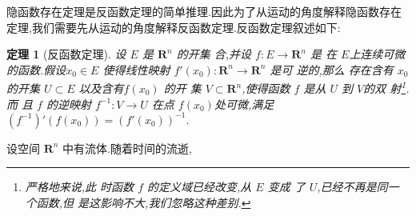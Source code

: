 \documentclass[a4paper, 12pt]{article} %
\newtheorem*{adtheorem}{定理}
\newenvironment{theorem}
{\bigskip\begin{mdframed}[backgroundcolor=gray!40,rightline=false,leftline=false,topline=false,bottomline=false]\begin{adtheorem}}
    {\end{adtheorem}\end{mdframed}\bigskip}
\begin{document}
隐函数存在定理是反函数定理的简单推理.因此为了从运动的角度解释隐函数存在
定理,我们需要先从运动的角度解释反函数定理.反函数定理叙述如下:
\begin{theorem}[反函数定理]
  设 $ E$ 是 $ \mathbf{R}^n$ 的开集 合,并设 $
  f:E\rightarrow\mathbf{R}^n$ 是 在 $ E$上连续可微的函数.假设$ x_0\in
  E$ 使得线性映射 $ f'(x_0):\mathbf{R}^n\rightarrow \mathbf{R}^n$ 是可
  逆的,那么 存在含有 $ x_0$ 的开集 $ U\subset E$ 以及含有$ f(x_0)$ 的开
  集 $ V\subset \mathbf{R}^n$,使得函数 $ f$ 是从 $ U$ 到 $ V$的双
  射\footnote{严格地来说,此 时函数 $ f$ 的定义域已经改变,从 $ E$ 变成
    了 $ U$,已经不再是同一个函数,但 是这影响不大,我们忽略这种差别.}.而
  且 $ f$ 的逆映射 $ f^{-1}:V\rightarrow U$ 在点 $ f(x_0)$处可微,满足$
  {\displaystyle (f^{-1})'(f(x_0))=(f'(x_0))^{-1}.}$
\end{theorem}
设空间 $\mathbf{R}^n$ 中有流体.随着时间的流逝,
  

  

  
\end{document}
